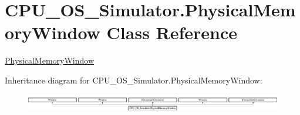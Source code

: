 \hypertarget{class_c_p_u___o_s___simulator_1_1_physical_memory_window}{}\section{C\+P\+U\+\_\+\+O\+S\+\_\+\+Simulator.\+Physical\+Memory\+Window Class Reference}
\label{class_c_p_u___o_s___simulator_1_1_physical_memory_window}


\hyperlink{class_c_p_u___o_s___simulator_1_1_physical_memory_window}{Physical\+Memory\+Window}  


Inheritance diagram for C\+P\+U\+\_\+\+O\+S\+\_\+\+Simulator.\+Physical\+Memory\+Window\+:\begin{figure}[H]
\begin{center}
\leavevmode
\includegraphics[height=0.826568cm]{class_c_p_u___o_s___simulator_1_1_physical_memory_window}
\end{center}
\end{figure}
